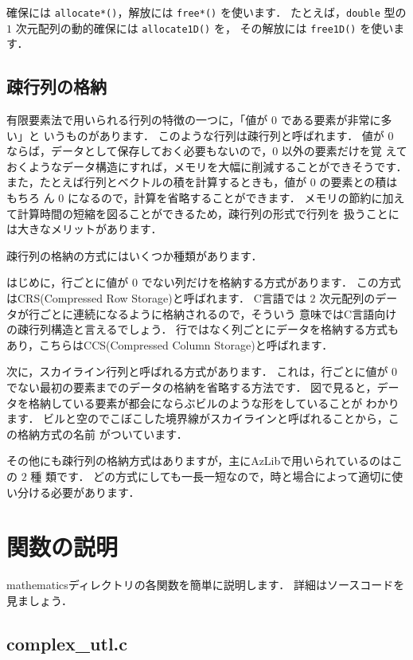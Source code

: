 確保には \verb|allocate*()|，解放には \verb|free*()| を使います．
たとえば，\verb|double| 型の $1$ 次元配列の動的確保には \verb|allocate1D()| を，
その解放には \verb|free1D()| を使います．


\subsection{疎行列の格納}
有限要素法で用いられる行列の特徴の一つに，「値が $0$ である要素が非常に多い」と
いうものがあります．
このような行列は疎行列と呼ばれます．
値が $0$ ならば，データとして保存しておく必要もないので，$0$ 以外の要素だけを覚
えておくようなデータ構造にすれば，メモリを大幅に削減することができそうです．
また，たとえば行列とベクトルの積を計算するときも，値が $0$ の要素との積はもちろ
ん $0$ になるので，計算を省略することができます．
メモリの節約に加えて計算時間の短縮を図ることができるため，疎行列の形式で行列を
扱うことには大きなメリットがあります．

疎行列の格納の方式にはいくつか種類があります．

はじめに，行ごとに値が $0$ でない列だけを格納する方式があります．
この方式はCRS(Compressed Row Storage)と呼ばれます．
C言語では $2$ 次元配列のデータが行ごとに連続になるように格納されるので，そういう
意味ではC言語向けの疎行列構造と言えるでしょう．
行ではなく列ごとにデータを格納する方式もあり，こちらはCCS(Compressed Column 
Storage)と呼ばれます．

次に，スカイライン行列と呼ばれる方式があります．
これは，行ごとに値が $0$ でない最初の要素までのデータの格納を省略する方法です．
図で見ると，データを格納している要素が都会にならぶビルのような形をしていることが
わかります．
ビルと空のでこぼこした境界線がスカイラインと呼ばれることから，この格納方式の名前
がついています．

その他にも疎行列の格納方式はありますが，主にAzLibで用いられているのはこの $2$ 種
類です．
どの方式にしても一長一短なので，時と場合によって適切に使い分ける必要があります．

\section{関数の説明}

mathematicsディレクトリの各関数を簡単に説明します．
詳細はソースコードを見ましょう．

\subsection{complex\_utl.c}

